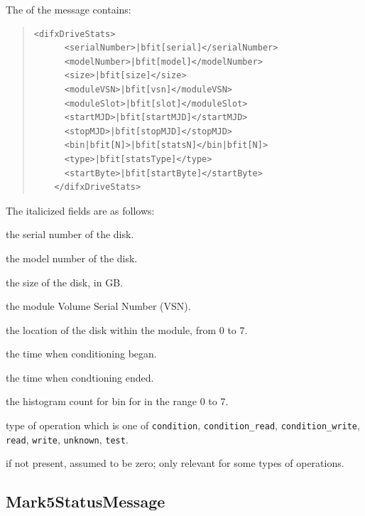\begin{description}
The  of the message contains:

\begin{quotation}
\begin{Verbatim}[commandchars=\|\[\]]
    <difxDriveStats>
      <serialNumber>|bfit[serial]</serialNumber>
      <modelNumber>|bfit[model]</modelNumber>
      <size>|bfit[size]</size>
      <moduleVSN>|bfit[vsn]</moduleVSN>
      <moduleSlot>|bfit[slot]</moduleSlot>
      <startMJD>|bfit[startMJD]</startMJD>
      <stopMJD>|bfit[stopMJD]</stopMJD>
      <bin|bfit[N]>|bfit[statsN]</bin|bfit[N]>
      <type>|bfit[statsType]</type>
      <startByte>|bfit[startByte]</startByte>
    </difxDriveStats>
\end{Verbatim}
\end{quotation}

\noindent The italicized fields are as follows:

\begin{description}
\item{} the serial number of the disk.
\item{} the model number of the disk.
\item{} the size of the disk, in GB.
\item{} the module Volume Serial Number (VSN).
\item{} the location of the disk within the module, from 0 to 7.
\item{} the time when conditioning began.
\item{} the time when condtioning ended.
\item{} the histogram count for bin  for  in the range 0 to 7.
\item{} type of operation which is one of {\tt condition}, {\tt condition\_read}, {\tt condition\_write}, {\tt read}, {\tt write}, {\tt unknown}, {\tt test}.
\item{} if not present, assumed to be zero; only relevant for some types of operations.
\end{description}








\subsection{Mark5StatusMessage}


\end{description}
